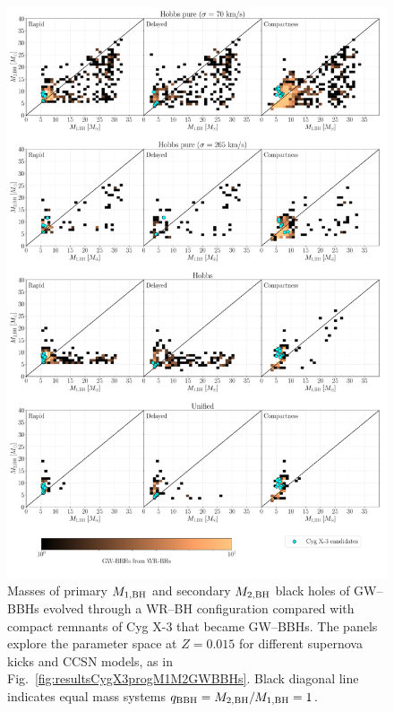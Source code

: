 \documentclass[a4paper,titlepage]{book}     	%
\begin{document}
\begin{figure}[h!]
	\centering
	\includegraphics[width=\textwidth]{./images/kickcompare_MBHMBH_015.pdf}	
	\caption{Masses of primary $M_{\rm 1, BH}$ and secondary $M_{\rm 2, BH}$ black holes of GW--BBHs evolved through a WR--BH configuration compared with compact remnants of Cyg X-3 that became GW--BBHs. The panels explore the parameter space at $Z=0.015$ for different supernova kicks and CCSN models, as in Fig.\ \ref{fig:resultsCygX3progM1M2GWBBHs}. Black diagonal line indicates equal mass systems $q_{\rm BBH}=M_{\rm 2,BH}/M_{\rm 1,BH} = 1$.}\label{fig:resultsCygX3remBHBHGWBBHs}
\end{figure}
\end{document}

